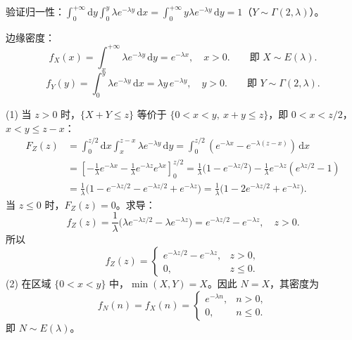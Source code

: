 \documentclass[lang=cn,11pt]{elegantbook}
\begin{document}
\begin{solution}
验证归一性：$\displaystyle\int_0^{+\infty}\mathrm{d}y\int_0^y \lambda e^{-\lambda y}\,\mathrm{d}x = \int_0^{+\infty}y\lambda e^{-\lambda y}\,\mathrm{d}y = 1$（$Y \sim \Gamma(2,\lambda)$）。

边缘密度：
\[
f_X(x) = \int_x^{+\infty}\lambda e^{-\lambda y}\,\mathrm{d}y = e^{-\lambda x}, \quad x > 0. \qquad \text{即 } X \sim E(\lambda).
\]
\[
f_Y(y) = \int_0^y \lambda e^{-\lambda y}\,\mathrm{d}x = \lambda y\,e^{-\lambda y}, \quad y > 0. \qquad \text{即 } Y \sim \Gamma(2,\lambda).
\]

(1) 当 $z > 0$ 时，$\{X+Y \leqslant z\}$ 等价于 $\{0 < x < y,\ x+y \leqslant z\}$，即 $0 < x < z/2$，$x < y \leqslant z-x$：
\begin{align*}
F_Z(z) &= \int_0^{z/2}\mathrm{d}x\int_x^{z-x}\lambda e^{-\lambda y}\,\mathrm{d}y = \int_0^{z/2}(e^{-\lambda x} - e^{-\lambda(z-x)})\,\mathrm{d}x\\
&= \left[-\frac{1}{\lambda}e^{-\lambda x} - \frac{1}{\lambda}e^{-\lambda z}e^{\lambda x}\right]_0^{z/2} = \frac{1}{\lambda}\bigl(1 - e^{-\lambda z/2}\bigr) - \frac{1}{\lambda}e^{-\lambda z}(e^{\lambda z/2} - 1)\\
&= \frac{1}{\lambda}\bigl(1 - e^{-\lambda z/2} - e^{-\lambda z/2} + e^{-\lambda z}\bigr) = \frac{1}{\lambda}\bigl(1 - 2e^{-\lambda z/2} + e^{-\lambda z}\bigr).
\end{align*}
当 $z \leqslant 0$ 时，$F_Z(z) = 0$。求导：
\[
f_Z(z) = \frac{1}{\lambda}\bigl(\lambda e^{-\lambda z/2} - \lambda e^{-\lambda z}\bigr) = e^{-\lambda z/2} - e^{-\lambda z}, \quad z > 0.
\]
所以
\[
f_Z(z) = \begin{cases} e^{-\lambda z/2} - e^{-\lambda z}, & z > 0, \\ 0, & z \leqslant 0. \end{cases}
\]
(2) 在区域 $\{0 < x < y\}$ 中，$\min(X,Y) = X$。因此 $N = X$，其密度为
\[
f_N(n) = f_X(n) = \begin{cases} e^{-\lambda n}, & n > 0, \\ 0, & n \leqslant 0. \end{cases}
\]
即 $N \sim E(\lambda)$。
\end{solution}
\end{document}
